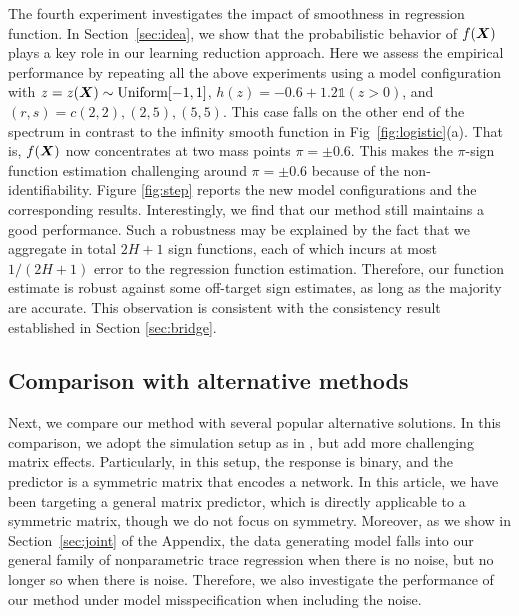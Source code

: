 \documentclass[aos]{imsart}
\theoremstyle{definition}
\begin{document}
The fourth experiment investigates the impact of smoothness in regression function. In Section~\ref{sec:idea}, we show that the probabilistic behavior of $f(\bm X)$ plays a key role in our learning reduction approach. Here we assess the empirical performance by repeating all the above experiments using a model configuration with $z=z(\bm X)\sim \text{Uniform}[-1,1]$, $h(z)=-0.6+1.2\mathds{1}(z>0)$, and $(r,s)=c(2,2),(2,5),(5,5)$. This case falls on the other end of the spectrum in contrast to the infinity smooth function in Fig~\ref{fig:logistic}(a). That is, $f(\bm X)$ now concentrates at two mass points $\pi=\pm 0.6$. This makes the $\pi$-sign function estimation challenging around $\pi=\pm 0.6$ because of the non-identifiability. Figure \ref{fig:step} reports the new model configurations and the corresponding results. Interestingly, we find that our method still maintains a good performance. Such a robustness may be explained by the fact that we aggregate in total $2H+1$ sign functions, each of which incurs at most $1/(2H+1)$ error to the regression function estimation. Therefore, our function estimate is robust against some off-target sign estimates, as long as the majority are accurate. This observation is consistent with the consistency result established in Section \ref{sec:bridge}.



\subsection{Comparison with alternative methods}
\label{sec:comparison}

Next, we compare our method with several popular alternative solutions. In this comparison, we adopt the simulation setup as in \cite{relion2019network}, but add more challenging matrix effects. Particularly, in this setup, the response is binary, and the predictor is a symmetric matrix that encodes a network. In this article, we have been targeting a general matrix predictor, which is directly applicable to a symmetric matrix, though we do not focus on symmetry. Moreover, as we show in Section~\ref{sec:joint} of the Appendix, the data generating model falls into our general family of nonparametric trace regression when there is no noise, but no longer so when there is noise. Therefore, we also investigate the performance of our method under model misspecification when including the noise. 
\end{document}
